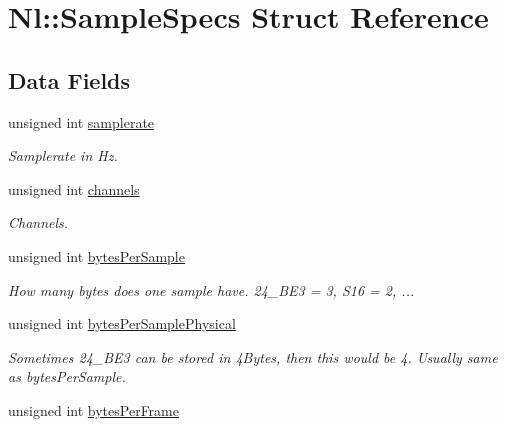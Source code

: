 \hypertarget{structNl_1_1SampleSpecs}{\section{Nl\-:\-:Sample\-Specs Struct Reference}
\label{structNl_1_1SampleSpecs}
}
\subsection*{Data Fields}
\begin{DoxyCompactItemize}
\item 
\hypertarget{structNl_1_1SampleSpecs_acb7588547dc0e783412aefe17048dedd}{unsigned int \hyperlink{structNl_1_1SampleSpecs_acb7588547dc0e783412aefe17048dedd}{samplerate}}\label{structNl_1_1SampleSpecs_acb7588547dc0e783412aefe17048dedd}

\begin{DoxyCompactList}\small\item\em Samplerate in Hz. \end{DoxyCompactList}\item 
\hypertarget{structNl_1_1SampleSpecs_a70b1a5e86b456e8cc98edc9b60a736da}{unsigned int \hyperlink{structNl_1_1SampleSpecs_a70b1a5e86b456e8cc98edc9b60a736da}{channels}}\label{structNl_1_1SampleSpecs_a70b1a5e86b456e8cc98edc9b60a736da}

\begin{DoxyCompactList}\small\item\em Channels. \end{DoxyCompactList}\item 
\hypertarget{structNl_1_1SampleSpecs_ac77e6fe1772e7732e361d6cf8b4a90b4}{unsigned int \hyperlink{structNl_1_1SampleSpecs_ac77e6fe1772e7732e361d6cf8b4a90b4}{bytes\-Per\-Sample}}\label{structNl_1_1SampleSpecs_ac77e6fe1772e7732e361d6cf8b4a90b4}

\begin{DoxyCompactList}\small\item\em How many bytes does one sample have. 24\-\_\-\-B\-E3 = 3, S16 = 2, ... \end{DoxyCompactList}\item 
\hypertarget{structNl_1_1SampleSpecs_a787b31b3cd063a0680d46e1b7029906b}{unsigned int \hyperlink{structNl_1_1SampleSpecs_a787b31b3cd063a0680d46e1b7029906b}{bytes\-Per\-Sample\-Physical}}\label{structNl_1_1SampleSpecs_a787b31b3cd063a0680d46e1b7029906b}

\begin{DoxyCompactList}\small\item\em Sometimes 24\-\_\-\-B\-E3 can be stored in 4\-Bytes, then this would be 4. Usually same as bytes\-Per\-Sample. \end{DoxyCompactList}\item 
\hypertarget{structNl_1_1SampleSpecs_af46b90202f051155b9ea1e528b0533af}{unsigned int \hyperlink{structNl_1_1SampleSpecs_af46b90202f051155b9ea1e528b0533af}{bytes\-Per\-Frame}}\label{structNl_1_1SampleSpecs_af46b90202f051155b9ea1e528b0533af}


\end{DoxyCompactItemize}
